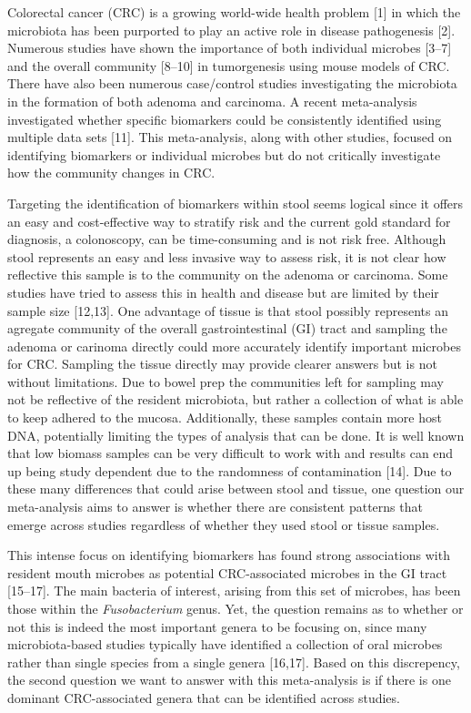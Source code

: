 \documentclass[12pt,]{article}
\begin{document}
Colorectal cancer (CRC) is a growing world-wide health problem {[}1{]}
in which the microbiota has been purported to play an active role in
disease pathogenesis {[}2{]}. Numerous studies have shown the importance
of both individual microbes {[}3--7{]} and the overall community
{[}8--10{]} in tumorgenesis using mouse models of CRC. There have also
been numerous case/control studies investigating the microbiota in the
formation of both adenoma and carcinoma. A recent meta-analysis
investigated whether specific biomarkers could be consistently
identified using multiple data sets {[}11{]}. This meta-analysis, along
with other studies, focused on identifying biomarkers or individual
microbes but do not critically investigate how the community changes in
CRC.

Targeting the identification of biomarkers within stool seems logical
since it offers an easy and cost-effective way to stratify risk and the
current gold standard for diagnosis, a colonoscopy, can be
time-consuming and is not risk free. Although stool represents an easy
and less invasive way to assess risk, it is not clear how reflective
this sample is to the community on the adenoma or carcinoma. Some
studies have tried to assess this in health and disease but are limited
by their sample size {[}12,13{]}. One advantage of tissue is that stool
possibly represents an agregate community of the overall
gastrointestinal (GI) tract and sampling the adenoma or carinoma
directly could more accurately identify important microbes for CRC.
Sampling the tissue directly may provide clearer answers but is not
without limitations. Due to bowel prep the communities left for sampling
may not be reflective of the resident microbiota, but rather a
collection of what is able to keep adhered to the mucosa. Additionally,
these samples contain more host DNA, potentially limiting the types of
analysis that can be done. It is well known that low biomass samples can
be very difficult to work with and results can end up being study
dependent due to the randomness of contamination {[}14{]}. Due to these
many differences that could arise between stool and tissue, one question
our meta-analysis aims to answer is whether there are consistent
patterns that emerge across studies regardless of whether they used
stool or tissue samples.

This intense focus on identifying biomarkers has found strong
associations with resident mouth microbes as potential CRC-associated
microbes in the GI tract {[}15--17{]}. The main bacteria of interest,
arising from this set of microbes, has been those within the
\emph{Fusobacterium} genus. Yet, the question remains as to whether or
not this is indeed the most important genera to be focusing on, since
many microbiota-based studies typically have identified a collection of
oral microbes rather than single species from a single genera
{[}16,17{]}. Based on this discrepency, the second question we want to
answer with this meta-analysis is if there is one dominant
CRC-associated genera that can be identified across studies.
\end{document}
